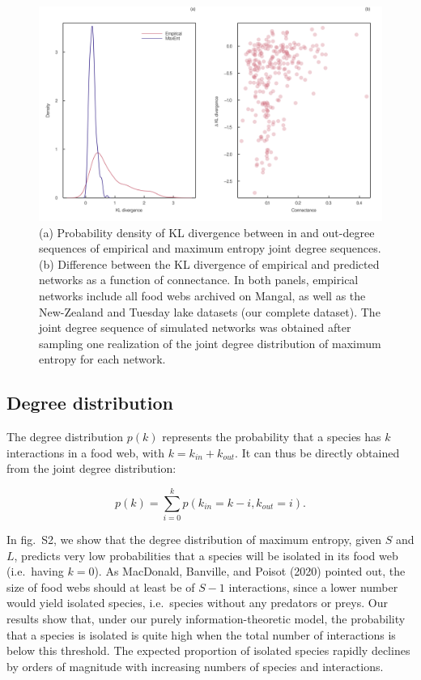 \documentclass[11pt]{article}
\makeatletter
\def\maxwidth{\ifdim\Gin@nat@width>\linewidth\linewidth
\else\Gin@nat@width\fi}
\let\Oldincludegraphics\includegraphics
\renewcommand{\includegraphics}[1]{\Oldincludegraphics[width=\maxwidth]{#1}}
\makeatother
\begin{document}
\begin{figure}
\hypertarget{fig:kl_diverg}{%
\centering
\includegraphics{figures/kl_divergence.png}
\caption{(a) Probability density of KL divergence between in and
out-degree sequences of empirical and maximum entropy joint degree
sequences. (b) Difference between the KL divergence of empirical and
predicted networks as a function of connectance. In both panels,
empirical networks include all food webs archived on Mangal, as well as
the New-Zealand and Tuesday lake datasets (our complete dataset). The
joint degree sequence of simulated networks was obtained after sampling
one realization of the joint degree distribution of maximum entropy for
each network.}\label{fig:kl_diverg}
}
\end{figure}

\hypertarget{degree-distribution}{%
\subsection{Degree distribution}\label{degree-distribution}}

The degree distribution \(p(k)\) represents the probability that a
species has \(k\) interactions in a food web, with
\(k = k_{in} + k_{out}\). It can thus be directly obtained from the
joint degree distribution:

\[p(k) = \sum_{i=0}^k p(k_{in} = k - i, k_{out} = i).\]

In fig.~S2, we show that the degree distribution of maximum entropy,
given \(S\) and \(L\), predicts very low probabilities that a species
will be isolated in its food web (i.e.~having \(k = 0\)). As MacDonald,
Banville, and Poisot (2020) pointed out, the size of food webs should at
least be of \(S-1\) interactions, since a lower number would yield
isolated species, i.e.~species without any predators or preys. Our
results show that, under our purely information-theoretic model, the
probability that a species is isolated is quite high when the total
number of interactions is below this threshold. The expected proportion
of isolated species rapidly declines by orders of magnitude with
increasing numbers of species and interactions.
\end{document}

